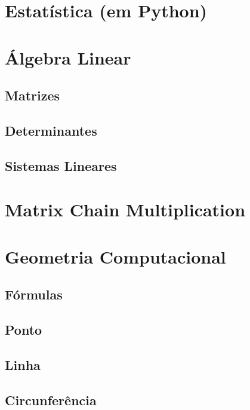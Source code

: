     \section{Estatística (em Python)}
        
        \newpage
    \section{Álgebra Linear}
        \subsection{Matrizes}
            
            \newpage
        \subsection{Determinantes}
            
            \newpage
        \subsection{Sistemas Lineares}
            
            \newpage
    \section{Matrix Chain Multiplication}
        
        \newpage
    \section{Geometria Computacional}
        \subsection{Fórmulas}
            
            \newpage
        
        \subsection{Ponto}
            
            \newpage
        \subsection{Linha}
            
            \newpage
        \subsection{Circunferência}
            
            \newpage

